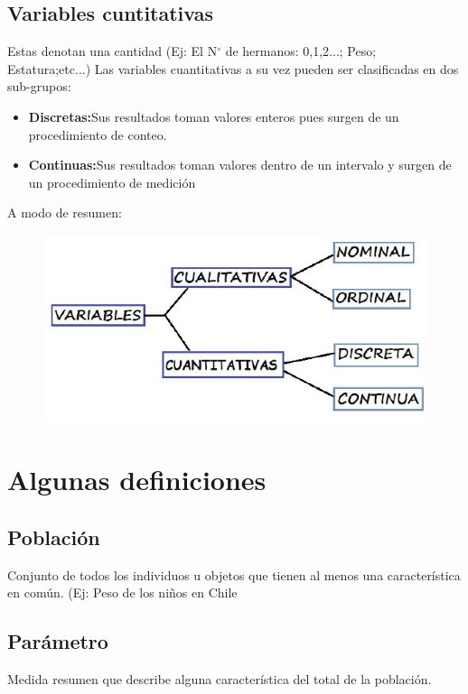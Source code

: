 \documentclass[12pt,twocolumn,a4paper]{report}
\begin{document}
\section*{Variables cuntitativas}
Estas denotan una cantidad (Ej: El N$^{\circ}$ de hermanos: 0,1,2...; Peso; Estatura;etc...)
Las variables cuantitativas a su vez pueden ser clasificadas en dos sub-grupos:
\begin{itemize}
\setlength\itemsep{0.001cm}
\item{\textbf{Discretas:}Sus resultados toman valores enteros pues surgen de un procedimiento de conteo.}
\item{\textbf{Continuas:}Sus resultados toman valores dentro de un intervalo y surgen de un procedimiento de medición}
\end{itemize}

A modo de resumen: 
\begin{figure}[H]
\centering
\includegraphics[scale=0.5]{graficos/1.png}
\end{figure}

\onecolumn
\chapter*{Algunas definiciones}
\section*{Población}
Conjunto de todos los individuos u objetos que tienen al menos una característica en común. (Ej: Peso de los niños en Chile
\section*{Parámetro}
Medida resumen que describe alguna característica del total de la población.
\end{document}
